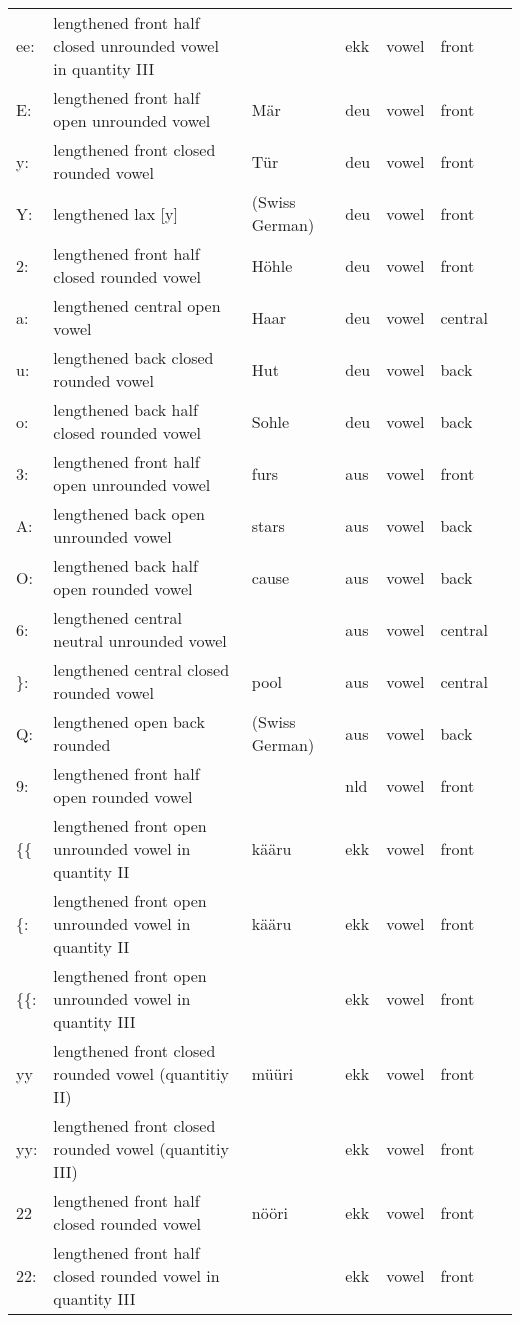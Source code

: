\begin{longtable}{l|p{.3\linewidth}|p{.15\linewidth}|l|l|l|l}
	ee:	& lengthened front half closed unrounded vowel in quantity III	& 	& ekk	& vowel	& front	\\
	E:	& lengthened front half open unrounded vowel	& Mär	& deu	& vowel	& front	\\
	y:	& lengthened front closed rounded vowel	& Tür	& deu	& vowel	& front	\\
	Y:	& lengthened lax [y]	& (Swiss German)	& deu	& vowel	& front	\\
	2:	& lengthened front half closed rounded vowel	& Höhle	& deu	& vowel	& front	\\
	a:	& lengthened central open vowel	& Haar	& deu	& vowel	& central	\\
	u:	& lengthened back closed rounded vowel	& Hut	& deu	& vowel	& back	\\
	o:	& lengthened back half closed rounded vowel	& Sohle	& deu	& vowel	& back	\\
	3:	& lengthened front half open unrounded vowel	& furs	& aus	& vowel	& front	\\
	A:	& lengthened back open unrounded vowel	& stars	& aus	& vowel	& back	\\
	O:	& lengthened back half open rounded vowel	& cause	& aus	& vowel	& back	\\
	6:	& lengthened central neutral unrounded vowel	& 	& aus	& vowel	& central	\\
	\}:	& lengthened central closed rounded vowel	& pool	& aus	& vowel	& central	\\
	Q:	& lengthened open back rounded	& (Swiss German)	& aus	& vowel	& back	\\
	9:	& lengthened front half open rounded vowel	& 	& nld	& vowel	& front	\\
	\{\{	& lengthened front open unrounded vowel in quantity II	& kääru	& ekk	& vowel	& front	\\
	\{:	& lengthened front open unrounded vowel in quantity II	& kääru	& ekk	& vowel	& front	\\
	\{\{:	& lengthened front open unrounded vowel in quantity III	& 	& ekk	& vowel	& front	\\
	yy	& lengthened front closed rounded vowel (quantitiy II)	& müüri	& ekk	& vowel	& front	\\
	yy:	& lengthened front closed rounded vowel (quantitiy III)	& 	& ekk	& vowel	& front	\\
	22	& lengthened front half closed rounded vowel	& nööri	& ekk	& vowel	& front	\\
	22:	& lengthened front half closed rounded vowel in quantity III	& 	& ekk	& vowel	& front	\\

\end{longtable}
